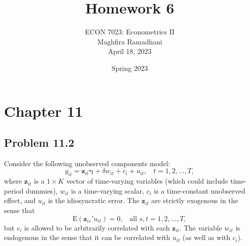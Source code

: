 \documentclass[10pt]{article}
\newcommand{\E}{\text{E}}
\begin{document}
 
\title{Homework 6}
\author{ECON 7023: Econometrics II\\
Maghfira Ramadhani\\
April 18, 2023}
\date{Spring 2023}
\maketitle

\section*{Chapter 11}
\subsection*{Problem 11.2}
Consider the following unobserved components model:
\[y_{it}=\textbf{z}_{it}\pmb{\gamma}+\delta w_{it}+c_i+u_{it},\ \ \ \ t=1,2,\ldots,T,\]
where $\textbf{z}_{it}$ is a $1\times K$ vector of time-varying variables (which could include time-period dummies), $w_{it}$ is a time-varying scalar, $c_i$ is a time-constant unobserved effect, and $u_{it}$ is the idiosyncratic error. The $\textbf{z}_{it}$ are strictly exogenous in the sense that
\[\E(\textbf{z}_{is}'u_{it})=0,\ \ \ \ \text{all }s,t=1,2,\ldots,T,\tag{11.99}\label{11.99}\]
but $c_i$ is allowed to be arbitrarily correlated with each $\textbf{z}_{it}$. The variable $w_{it}$ is endogenous in the sense that it can be correlated with $u_{it}$ (as well as with $c_i$).
\end{document}
